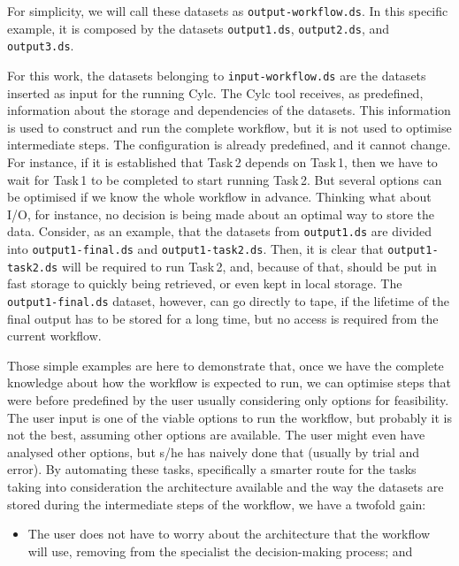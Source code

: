 \documentclass[a4paper]{article}
\begin{document}
{{{{\begin{description}
For simplicity, we will call these datasets as \texttt{output-workflow.ds}. In this specific example, it is composed by the datasets \texttt{output1.ds}, \texttt{output2.ds}, and \texttt{output3.ds}.

\end{description}

For this work, the datasets belonging to \texttt{input-workflow.ds} are the datasets inserted as input for the running Cylc. The Cylc tool receives, as predefined, information about the storage and dependencies of the datasets. This information is used to construct and run the complete workflow, but it is not used to optimise intermediate steps.
The configuration is already predefined, and it cannot change. For instance, if it is established that Task\,2 depends on Task\,1, then we have to wait for Task\,1 to be completed to start running Task\,2.
But several options can be optimised if we know the whole workflow in advance. Thinking what about I/O, for instance, no decision is being made about an optimal way to store the data. Consider, as an example, that the datasets from \texttt{output1.ds} are divided into \texttt{output1-final.ds} and \texttt{output1-task2.ds}. Then, it is clear that \texttt{output1-task2.ds} will be required to run Task\,2, and, because of that, should be put in fast storage to quickly being retrieved, or even kept in local storage. The \texttt{output1-final.ds} dataset, however, can go directly to tape, if the lifetime of the final output has to be stored for a long time, but no access is required from the current workflow.

Those simple examples are here to demonstrate that, once we have the complete knowledge about how the workflow is expected to run, we can optimise steps that were before predefined by the user usually considering only options for feasibility. The user input is one of the viable options to run the workflow, but probably it is not the best, assuming other options are available. The user might even have analysed other options, but s/he has naively done that (usually by trial and error). By automating these tasks, specifically a smarter route for the tasks taking into consideration the architecture available and the way the datasets are stored during the intermediate steps of the workflow, we have a twofold gain:

\begin{itemize}

\item The user does not have to worry about the architecture that the workflow will use, removing from the specialist the decision-making process; and


\end{itemize}}}}}
\end{document}
